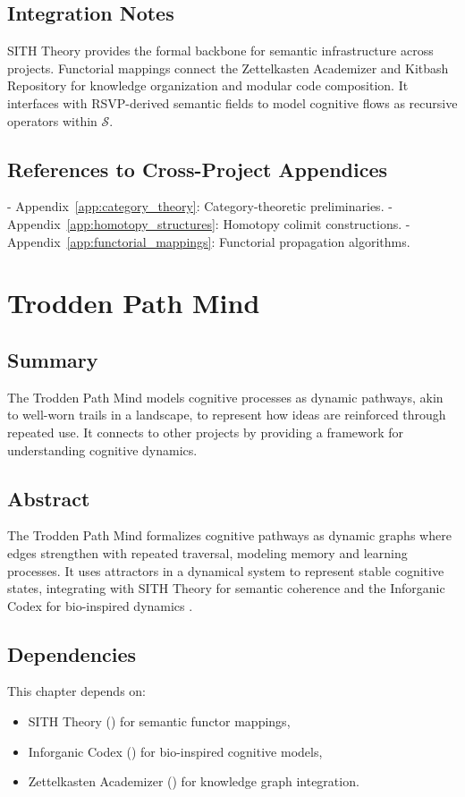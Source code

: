 \documentclass[11pt,oneside]{memoir}
\theoremstyle{plain}
\newcommand{\Sfun}{\mathcal{S}}
\begin{document}
\section{Integration Notes}
SITH Theory provides the formal backbone for semantic infrastructure across projects. Functorial mappings connect the Zettelkasten Academizer and Kitbash Repository for knowledge organization and modular code composition. It interfaces with RSVP-derived semantic fields to model cognitive flows as recursive operators within \(\Sfun\).

\section{References to Cross-Project Appendices}
- Appendix~\ref{app:category_theory}: Category-theoretic preliminaries.
- Appendix~\ref{app:homotopy_structures}: Homotopy colimit constructions.
- Appendix~\ref{app:functorial_mappings}: Functorial propagation algorithms.

\chapter{Trodden Path Mind}
\label{sec:trodden_path}

\section{Summary}
The Trodden Path Mind models cognitive processes as dynamic pathways, akin to well-worn trails in a landscape, to represent how ideas are reinforced through repeated use. It connects to other projects by providing a framework for understanding cognitive dynamics.

\section{Abstract}
The Trodden Path Mind formalizes cognitive pathways as dynamic graphs where edges strengthen with repeated traversal, modeling memory and learning processes. It uses attractors in a dynamical system to represent stable cognitive states, integrating with SITH Theory for semantic coherence and the Inforganic Codex for bio-inspired dynamics \cite{maclane}.

\section{Dependencies}
This chapter depends on:
\begin{itemize}
    \item SITH Theory () for semantic functor mappings,
    \item Inforganic Codex () for bio-inspired cognitive models,
    \item Zettelkasten Academizer () for knowledge graph integration.
\end{itemize}
\end{document}

